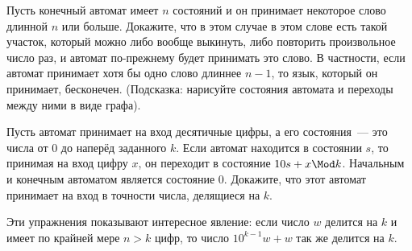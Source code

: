 \begin{exercise}
	Пусть конечный автомат имеет $n$ состояний и он принимает некоторое слово длинной $n$ или больше. Докажите, что в этом случае в этом слове есть такой участок, который можно либо вообще выкинуть, либо повторить произвольное число раз, и автомат по-прежнему будет принимать это слово. В частности, если автомат принимает хотя бы одно слово длиннее $n-1$, то язык, который он принимает, бесконечен. (Подсказка: нарисуйте состояния автомата и переходы между ними в виде графа).
\end{exercise}

\begin{exercise}
	Пусть автомат принимает на вход десятичные цифры, а его состояния~--- это числа от 0 до наперёд заданного $k$. Если автомат находится в состоянии $s$, то принимая на вход цифру $x$, он переходит в состояние $10s + x \Mod k$. Начальным и конечным автоматом является состояние 0. Докажите, что этот автомат принимает на вход в точности числа, делящиеся на $k$.
\end{exercise}

Эти упражнения показывают интересное явление: если число $w$ делится на $k$ и имеет по крайней мере $n>k$ цифр, то число $10^{k-1}w + w$ так же делится на $k$.